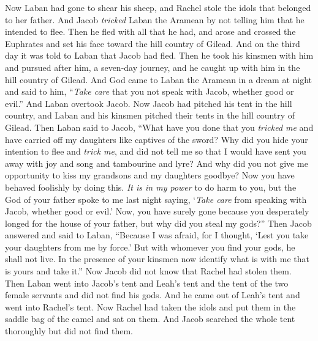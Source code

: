 \begin{biblechapter}
\verse Now Laban had gone to shear his sheep, and Rachel stole the idols that belonged to her father.
\verse And Jacob \textit{tricked} Laban the Aramean by not telling him that he intended to flee.
\verse Then he fled with all that he had, and arose and crossed the Euphrates and set his face toward the hill country of Gilead.
\verse And on the third day it was told to Laban that Jacob had fled.
\verse Then he took his kinsmen with him and pursued after him, a seven-day journey, and he caught up with him in the hill country of Gilead.
\verse And God came to Laban the Aramean in a dream at night and said to him, “\textit{Take care} that you not speak with Jacob, whether good or evil.”
\verse And Laban overtook Jacob. Now Jacob had pitched his tent in the hill country, and Laban and his kinsmen pitched their tents in the hill country of Gilead.
\verse Then Laban said to Jacob, “What have you done that you \textit{tricked me} and have carried off my daughters like captives of the sword?
\verse Why did you hide your intention to flee and \textit{trick me}, and did not tell me so that I would have sent you away with joy and song and tambourine and lyre?
\verse And why did you not give me opportunity to kiss my grandsons and my daughters goodbye? Now you have behaved foolishly by doing this.
\verse \textit{It is in my power} to do harm to you, but the God of your father spoke to me last night saying, ‘\textit{Take care} from speaking with Jacob, whether good or evil.’
\verse Now, you have surely gone because you desperately longed for the house of your father, but why did you steal my gods?”
\verse Then Jacob answered and said to Laban, “Because I was afraid, for I thought, ‘Lest you take your daughters from me by force.’
\verse But with whomever you find your gods, he shall not live. In the presence of your kinsmen now identify what is with me that is yours and take it.” Now Jacob did not know that Rachel had stolen them.
\verse Then Laban went into Jacob’s tent and Leah’s tent and the tent of the two female servants and did not find his gods. And he came out of Leah’s tent and went into Rachel’s tent.
\verse Now Rachel had taken the idols and put them in the saddle bag of the camel and sat on them. And Jacob searched the whole tent thoroughly but did not find them.

\end{biblechapter}
